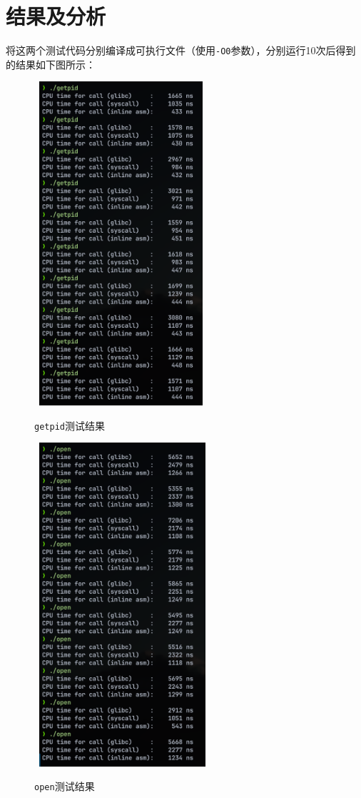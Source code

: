 \section{结果及分析}

将这两个测试代码分别编译成可执行文件（使用{\tt -O0}参数），分别运行10次后得到的结果如下图所示：

\begin{figure}[H]
    \centering
    \begin{minipage}[t]{0.45\textwidth}\
        \includegraphics[height=12cm]{fig/getpid.png}
        \caption{{\tt getpid}测试结果}
    \end{minipage}
    \begin{minipage}[t]{0.45\textwidth}\
        \includegraphics[height=12cm]{fig/open.png}
        \caption{{\tt open}测试结果}
    \end{minipage}
\end{figure}

